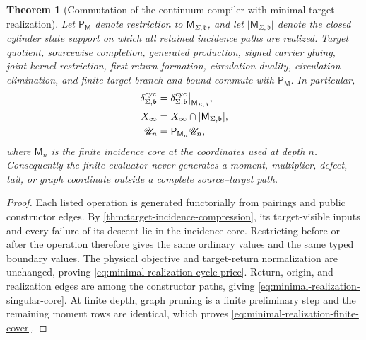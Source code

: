 \documentclass[11pt]{article}
\numberwithin{section}{part}
\theoremstyle{plain}
\newtheorem{theorem}{Theorem}[section]
\theoremstyle{definition}
\theoremstyle{remark}
\begin{document}
\begin{theorem}[Commutation of the continuum compiler with minimal
target realization]
\label{thm:minimal-realization-compiler-commutation}
Let \(\mathsf P_{\mathsf M}\) denote restriction to
\(\mathsf M_{\Sigma,\mathfrak b}\), and let
\(\lvert\mathsf M_{\Sigma,\mathfrak b}\rvert\) denote the closed cylinder
state support on which all retained incidence paths are realized.  Target quotient, sourcewise completion,
generated production, signed carrier gluing, joint-kernel restriction,
first-return formation, circulation duality, circulation elimination, and
finite target branch-and-bound commute with \(\mathsf P_{\mathsf M}\).
In particular,
\begin{align}
 \delta^{\rm cyc}_{\Sigma,\mathfrak b}
 &=\delta^{\rm cyc}_{\Sigma,\mathfrak b}
       \big|_{\mathsf M_{\Sigma,\mathfrak b}},
 \label{eq:minimal-realization-cycle-price}\\
 X_\infty
 &=X_\infty\cap
   \lvert\mathsf M_{\Sigma,\mathfrak b}\rvert,
 \label{eq:minimal-realization-singular-core}\\
 \mathscr U_n
 &=\mathsf P_{\mathsf M_n}\mathscr U_n,
 \label{eq:minimal-realization-finite-cover}
\end{align}
where \(\mathsf M_n\) is the finite incidence core at the coordinates used at
depth \(n\).  Consequently the finite evaluator never generates a moment,
multiplier, defect, tail, or graph coordinate outside a complete
source--target path.
\end{theorem}

\begin{proof}
Each listed operation is generated functorially from pairings and public
constructor edges.  By \cref{thm:target-incidence-compression}, its
target-visible inputs and every failure of its descent lie in the incidence
core.  Restricting before or after the operation therefore gives the same
ordinary values and the same typed boundary values.  The physical objective
and target-return normalization are unchanged, proving
\eqref{eq:minimal-realization-cycle-price}.  Return, origin, and realization
edges are among the constructor paths, giving
\eqref{eq:minimal-realization-singular-core}.  At finite depth, graph pruning
is a finite preliminary step and the remaining moment rows are identical,
which proves \eqref{eq:minimal-realization-finite-cover}.
\end{proof}
\end{document}
